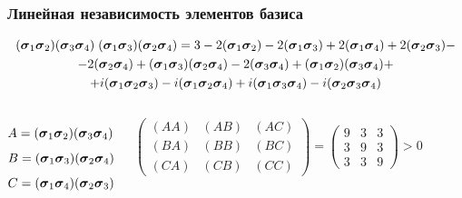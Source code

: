 \documentclass{beamer}
\begin{document}
\begin{frame}
\frametitle{Линейная независимость элементов базиса}
\small
$$\begin{gathered}(\cc_1\cc_2)(\cc_3\cc_4)\;(\cc_1\cc_3)(\cc_2\cc_4) = 
3-2 (\cc_1\cc_2)-2 (\cc_1\cc_3)+2 (\cc_1\cc_4)+2 (\cc_2\cc_3)-\\
-2 (\cc_2\cc_4)+(\cc_1\cc_3) (\cc_2\cc_4)-2 (\cc_3\cc_4)+(\cc_1\cc_2) (\cc_3\cc_4)+\\+i (\cc_1\cc_2\cc_3)-i (\cc_1\cc_2\cc_4)+i (\cc_1\cc_3\cc_4)-i (\cc_2\cc_3\cc_4)\end{gathered}$$

\begin{columns}[c] %
$$A=(\cc_1\cc_2)(\cc_3\cc_4)$$
$$B=(\cc_1\cc_3)(\cc_2\cc_4)$$
$$C=(\cc_1\cc_4)(\cc_2\cc_3)$$

$$
\begin{pmatrix}
(AA)&(AB)&(AC)\\
(BA)&(BB)&(BC)\\
(CA)&(CB)&(CC)
\end{pmatrix}
=
\begin{pmatrix}
9&3&3\\
3&9&3\\
3&3&9
\end{pmatrix}
> 0
$$
\end{columns}
\normalsize
\end{frame}
\end{document}

